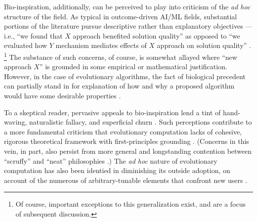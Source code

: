 Bio-inspiration, additionally, can be perceived to play into criticism of the \textit{ad hoc} structure of the field.
As typical in outcome-driven AI/ML fields, substantial portions of the literature pursue descriptive rather than explanatory objectives --- i.e., ``we found that $X$ approach benefited solution quality'' as opposed to ``we evaluated how $Y$ mechanism mediates effects of $X$ approach on solution quality'' \citep{lipton2019troubling,hutson2018ai,sculley2018winner,del2019bio}.%
\footnote{%
  Of course, important exceptions to this generalization exist, and are a focus of subsequent discussion.
}
The substance of such concerns, of course, is somewhat allayed where ``new approach $X$'' is grounded in some empirical or mathematical justification.
However, in the case of evolutionary algorithms, the fact of biological precedent can partially stand in for explanation of how and why a proposed algorithm would have some desirable properties \citep{sorenson2015metaheuristics}.

To a skeptical reader, pervasive appeals to bio-inspiration lend a tint of hand-waving, naturalistic fallacy, and superficial churn \citep{wortmann2020does,sorensen2015metaheuristics}.
Such perceptions contribute to a more fundamental criticism that evolutionary computation lacks of cohesive, rigorous theoretical framework with first-principles grounding \citep{TODO}.
(Concerns in this vein, in part, also persist from more general and longstanding contention between ``scruffy'' and ``neat'' philosophies \citep[p. 16]{jones2008artificial} \citep{minsky1991logical}.)
The \textit{ad hoc} nature of evolutionary computation has also been identied in diminishing its outside adoption, on account of the numerous of arbitrary-tunable elements that confront new users \citep{oneil2010open}.

